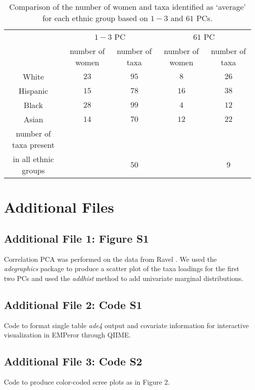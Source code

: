 \documentclass[doublespacing]{bmcart}
\begin{document}
\begin{backmatter}
\begin{table}[h]
\centering
\caption{Comparison of the number of women and taxa identified as `average' for each ethnic group based on $1-3$ and $61$ PCs.}
\begin{tabular}{|c|cc|cc|} \hline
				&	\multicolumn{2}{c|}{$1-3$ PC} &\multicolumn{2}{c|}{$61$ PC}\\
				&	number of women 	& number of taxa 	& number of women 	& number of taxa \\ \hline
White			& $23$		&$95$	&$8$			&$26$	\\
Hispanic			&$15$		&$78$	&$16$		&$38$	\\
Black			&$28$		&$99$	&$4$			&$12$	\\
Asian			&$14$		&$70$	&$12$		&$22$	\\ \hline
number of taxa present&			&		&			&		\\
in all ethnic groups	&			&$50$	&			&$9$		\\ \hline
\end{tabular}
\label{table:n_taxa}
\end{table}





\section*{Additional Files}


\subsection*{Additional File 1: Figure S1}  Correlation PCA was performed on the data from Ravel \cite{Ravel}.  We used the \textit{adegraphics} package to produce a scatter plot of the taxa loadings for the first two PCs and used the \textit{addhist} method to add univariate marginal distributions.

\subsection*{Additional File 2: Code S1} Code to format single table {\it ade4} output and covariate information for interactive visualization in EMPeror through QIIME.  

\subsection*{Additional File 3: Code S2}  Code to produce color-coded scree plots as in Figure 2.


\end{backmatter}
\end{document}
